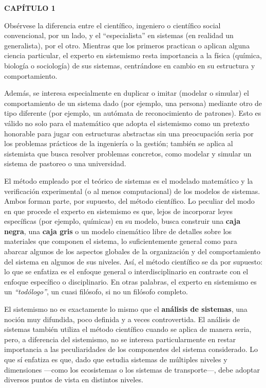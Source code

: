\newpage

\pagestyle{fancy}
\begin{center}
{\fontsize{16}{18}\selectfont \textbf{CAPÍTULO 1}}\\[0.8cm]
\end{center}

\vspace{1cm}

{\fontsize{13}{15}\selectfont
Obsérvese la diferencia entre el científico, ingeniero o científico social convencional, por un lado, y el “especialista” en sistemas (en realidad un generalista), por el otro. Mientras que los primeros practican o aplican alguna ciencia particular, el experto en sistemismo resta importancia a la física (química, biología o sociología) de sus sistemas, centrándose en cambio en su estructura y comportamiento.

Además, se interesa especialmente en duplicar o imitar (modelar o simular) el comportamiento de un sistema dado (por ejemplo, una persona) mediante otro de tipo diferente (por ejemplo, un autómata de reconocimiento de patrones). Esto es válido no solo para el matemático que adopta el sistemismo como un pretexto honorable para jugar con estructuras abstractas sin una preocupación seria por los problemas prácticos de la ingeniería o la gestión; también se aplica al sistemista que busca resolver problemas concretos, como modelar y simular un sistema de pastoreo o una universidad.

El método empleado por el teórico de sistemas es el modelado matemático y la verificación experimental (o al menos computacional) de los modelos de sistemas. Ambos forman parte, por supuesto, del método científico. Lo peculiar del modo en que procede el experto en sistemismo es que, lejos de incorporar leyes específicas (por ejemplo, químicas) en su modelo, busca construir una \textbf{caja negra}, una \textbf{caja gris} o un modelo cinemático libre de detalles sobre los materiales que componen el sistema, lo suficientemente general como para abarcar algunos de los aspectos globales de la organización y del comportamiento del sistema en algunos de sus niveles.  
Así, el método científico se da por supuesto: lo que se enfatiza es el enfoque general o interdisciplinario en contraste con el enfoque específico o disciplinario. En otras palabras, el experto en sistemismo es un \textit{“todólogo”}, un cuasi filósofo, si no un filósofo completo.

El sistemismo no es exactamente lo mismo que el \textbf{análisis de sistemas}, una noción muy difundida, poco definida y a veces controvertida. El análisis de sistemas también utiliza el método científico cuando se aplica de manera seria, pero, a diferencia del sistemismo, no se interesa particularmente en restar importancia a las peculiaridades de los componentes del sistema considerado.  
Lo que sí enfatiza es que, dado que estudia sistemas de múltiples niveles y dimensiones —como los ecosistemas o los sistemas de transporte—, debe adoptar diversos puntos de vista en distintos niveles.

}
